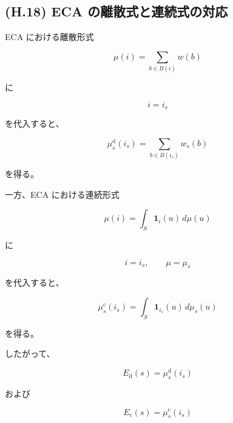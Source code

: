 \documentclass[a4paper,11pt]{article}
\begin{document}
\subsection{(H.18) ECA の離散式と連続式の対応}
\label{subsec:H18}

ECA における離散形式

\begin{equation}
    \mu(i)
    =
    \sum_{b\in B(i)}w(b)
    \label{eq:H-ECA-discrete}
\end{equation}

に

\begin{equation}
    i=i_s
\end{equation}

を代入すると、

\begin{equation}
    \boxed{
        \mu_s^{\mathrm d}(i_s)
        =
        \sum_{b\in B(i_s)}w_s(b)
    }
    \label{eq:H-discrete-form}
\end{equation}

を得る。

一方、ECA における連続形式

\begin{equation}
    \mu(i)
    =
    \int_S
    \mathbf1_i(u)\,d\mu(u)
    \label{eq:H-ECA-continuous}
\end{equation}

に

\begin{equation}
    i=i_s,
    \qquad
    \mu=\mu_s
\end{equation}

を代入すると、

\begin{equation}
    \boxed{
        \mu_s^{\mathrm c}(i_s)
        =
        \int_S
        \mathbf1_{i_s}(u)\,d\mu_s(u)
    }
    \label{eq:H-continuous-form}
\end{equation}

を得る。

したがって、

\begin{equation}
    \boxed{
        E_{\mathrm d}(s)
        =
        \mu_s^{\mathrm d}(i_s)
    }
\end{equation}

および

\begin{equation}
    \boxed{
        E_{\mathrm c}(s)
        =
        \mu_s^{\mathrm c}(i_s)
    }
\end{equation}
\end{document}
